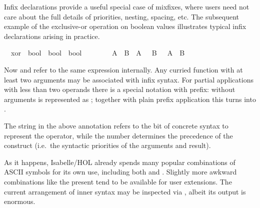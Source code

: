 \begin{isabellebody}
\begin{isamarkuptext}
  Infix declarations provide a useful special
  case of mixfixes, where users need not care about the full details
  of priorities, nesting, spacing, etc.  The subsequent example of the
  exclusive-or operation on boolean values illustrates typical infix
  declarations arising in practice.%
\end{isamarkuptext}%
\isamarkuptrue%
\isanewline
\ \ xor\ {\isacharcolon}{\isacharcolon}\ {\isachardoublequote}bool\ {\isasymRightarrow}\ bool\ {\isasymRightarrow}\ bool{\isachardoublequote}\ \ \ \ {\isacharparenleft}\ {\isachardoublequote}{\isacharbrackleft}{\isacharplus}{\isacharbrackright}{\isachardoublequote}\ {}{}{\isacharparenright}\isanewline
\ \ {\isachardoublequote}A\ {\isacharbrackleft}{\isacharplus}{\isacharbrackright}\ B\ {\isasymequiv}\ {\isacharparenleft}A\ {\isasymand}\ {\isasymnot}\ B{\isacharparenright}\ {\isasymor}\ {\isacharparenleft}{\isasymnot}\ A\ {\isasymand}\ B{\isacharparenright}{\isachardoublequote}\isamarkupfalse%
%
\begin{isamarkuptext}%
\noindent Now  and  refer to the
  same expression internally.  Any curried function with at least two
  arguments may be associated with infix syntax.  For partial
  applications with less than two operands there is a special notation
  with  prefix:  without arguments is represented
  as ; together with plain prefix application this
  turns  into .

  \medskip The string \isa{{\isachardoublequote}{\isacharbrackleft}{\isacharplus}{\isacharbrackright}{\isachardoublequote}} in the above annotation
  refers to the bit of concrete syntax to represent the operator,
  while the number  determines the precedence of the
  construct (i.e.\ the syntactic priorities of the arguments and
  result).

  As it happens, Isabelle/HOL already spends many popular combinations
  of ASCII symbols for its own use, including both \isa{{\isacharplus}} and
  \isa{{\isacharplus}{\isacharplus}}.  Slightly more awkward combinations like the present
  \isa{{\isacharbrackleft}{\isacharplus}{\isacharbrackright}} tend to be available for user extensions.  The current
  arrangement of inner syntax may be inspected via
  , albeit its output is enormous.


\end{isamarkuptext}
\end{isabellebody}
